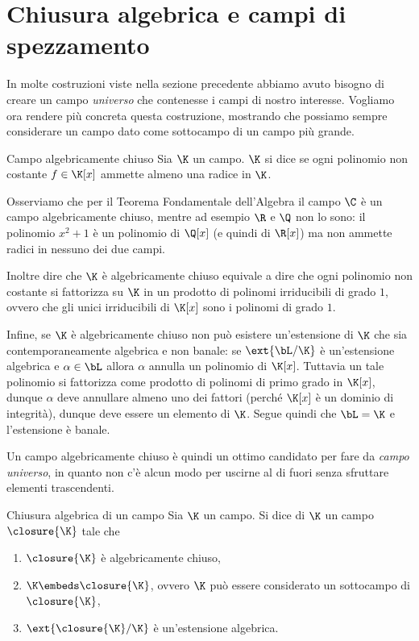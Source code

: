 \section{Chiusura algebrica e campi di spezzamento}

In molte costruzioni viste nella sezione precedente abbiamo avuto bisogno di creare un campo \emph{universo} che contenesse i campi di nostro interesse. Vogliamo ora rendere più concreta questa costruzione, mostrando che possiamo sempre considerare un campo dato come sottocampo di un campo più grande. 

\begin{definition}
    {Campo algebricamente chiuso}{}
    Sia $\K$ un campo. $\K$ si dice  se ogni polinomio non costante $f \in \K[x]$ ammette almeno una radice in $\K$. 
\end{definition}

Osserviamo che per il Teorema Fondamentale dell'Algebra il campo $\C$ è un campo algebricamente chiuso, mentre ad esempio $\R$ e $\Q$ non lo sono: il polinomio $x^2 + 1$ è un polinomio di $\Q[x]$ (e quindi di $\R[x]$) ma non ammette radici in nessuno dei due campi.

Inoltre dire che $\K$ è algebricamente chiuso equivale a dire che ogni polinomio non costante si fattorizza su $\K$ in un prodotto di polinomi irriducibili di grado $1$, ovvero che gli unici irriducibili di $\K[x]$ sono i polinomi di grado $1$.

Infine, se $\K$ è algebricamente chiuso non può esistere un'estensione di $\K$ che sia contemporaneamente algebrica e non banale: se $\ext{\bL / \K}$ è un'estensione algebrica e $\alpha \in \bL$ allora $\alpha$ annulla un polinomio di $\K[x]$. Tuttavia un tale polinomio si fattorizza come prodotto di polinomi di primo grado in $\K[x]$, dunque $\alpha$ deve annullare almeno uno dei fattori (perché $\K[x]$ è un dominio di integrità), dunque deve essere un elemento di $\K$. Segue quindi che $\bL = \K$ e l'estensione è banale.

Un campo algebricamente chiuso è quindi un ottimo candidato per fare da \emph{campo universo}, in quanto non c'è alcun modo per uscirne al di fuori senza sfruttare elementi trascendenti.

\begin{definition}
    {Chiusura algebrica di un campo}{}
    Sia $\K$ un campo. Si dice  di $\K$ un campo $\closure{\K}$ tale che \begin{enumerate}[(1)]
        \item $\closure{\K}$ è algebricamente chiuso,
        \item $\K \embeds \closure{\K}$, ovvero $\K$ può essere considerato un sottocampo di $\closure{\K}$,  
        \item $\ext{\closure{\K} / \K}$ è un'estensione algebrica.
    \end{enumerate}
\end{definition}

